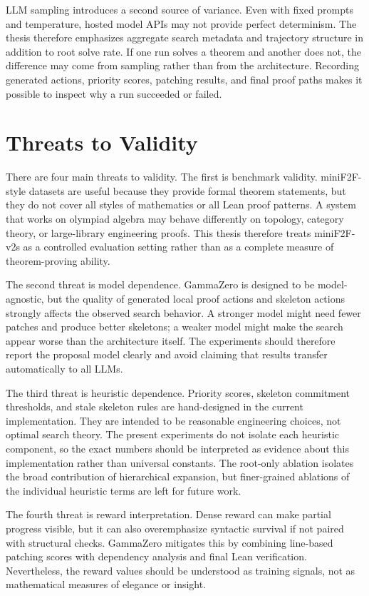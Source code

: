 LLM sampling introduces a second source of variance. Even with fixed prompts and temperature, hosted
model APIs may not provide perfect determinism. The thesis therefore emphasizes aggregate search
metadata and trajectory structure in addition to root solve rate. If one run solves a theorem and another
does not, the difference may come from sampling rather than from the architecture. Recording generated
actions, priority scores, patching results, and final proof paths makes it possible to inspect why a run
succeeded or failed.

\section{Threats to Validity}

There are four main threats to validity. The first is benchmark validity. miniF2F-style datasets are useful
because they provide formal theorem statements, but they do not cover all styles of mathematics or all
Lean proof patterns. A system that works on olympiad algebra may behave differently on topology,
category theory, or large-library engineering proofs. This thesis therefore treats miniF2F-v2s as a
controlled evaluation setting rather than as a complete measure of theorem-proving ability.

The second threat is model dependence. GammaZero is designed to be model-agnostic, but the quality of
generated local proof actions and skeleton actions strongly affects the observed search behavior. A stronger model might
need fewer patches and produce better skeletons; a weaker model might make the search appear worse
than the architecture itself. The experiments should therefore report the proposal model clearly and avoid
claiming that results transfer automatically to all LLMs.

The third threat is heuristic dependence. Priority scores, skeleton commitment thresholds, and stale
skeleton rules are hand-designed in the current implementation. They are intended to be reasonable
engineering choices, not optimal search theory. The present experiments do not isolate each heuristic
component, so the exact numbers should be interpreted as evidence about this implementation rather than
universal constants. The root-only ablation isolates the broad contribution of hierarchical expansion,
but finer-grained ablations of the individual heuristic terms are left for future work.

The fourth threat is reward interpretation. Dense reward can make partial progress visible, but it can
also overemphasize syntactic survival if not paired with structural checks. GammaZero mitigates this by
combining line-based patching scores with dependency analysis and final Lean verification. Nevertheless,
the reward values should be understood as training signals, not as mathematical measures of elegance or
insight.
